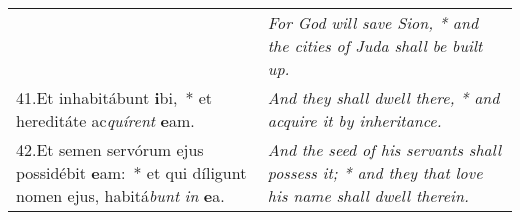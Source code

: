 \begin{longtable}{@{\hskip0pt} p{9.5cm} | p{6.5cm} @{\hskip0pt}}
 & \textit{\small For God will save Sion, * and the cities of Juda shall be built up.
}\\
41.\enspace Et inhabitábunt \textbf{i}bi,~* et hereditáte ac\textit{quí}\textit{rent} \textbf{e}am.
 & \textit{\small And they shall dwell there, * and acquire it by inheritance.
}\\
42.\enspace Et semen servórum ejus possidébit \textbf{e}am:~* et qui díligunt nomen ejus, habitá\textit{bunt} \textit{in} \textbf{e}a. & \textit{\small And the seed of his servants shall possess it; * and they that love his name shall dwell therein.}\\
\end{longtable}